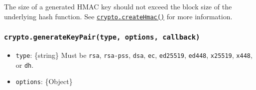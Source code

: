 The size of a generated HMAC key should not exceed the block size of the
underlying hash function. See
\hyperref[cryptocreatehmacalgorithm-key-options]{\texttt{crypto.createHmac()}}
for more information.

\subsubsection{\texorpdfstring{\texttt{crypto.generateKeyPair(type,\ options,\ callback)}}{crypto.generateKeyPair(type, options, callback)}}\label{crypto.generatekeypairtype-options-callback}

\begin{itemize}
\tightlist
\item
  \texttt{type}: \{string\} Must be
  \texttt{\textquotesingle{}rsa\textquotesingle{}},
  \texttt{\textquotesingle{}rsa-pss\textquotesingle{}},
  \texttt{\textquotesingle{}dsa\textquotesingle{}},
  \texttt{\textquotesingle{}ec\textquotesingle{}},
  \texttt{\textquotesingle{}ed25519\textquotesingle{}},
  \texttt{\textquotesingle{}ed448\textquotesingle{}},
  \texttt{\textquotesingle{}x25519\textquotesingle{}},
  \texttt{\textquotesingle{}x448\textquotesingle{}}, or
  \texttt{\textquotesingle{}dh\textquotesingle{}}.
\item
  \texttt{options}: \{Object\}


\end{itemize}
